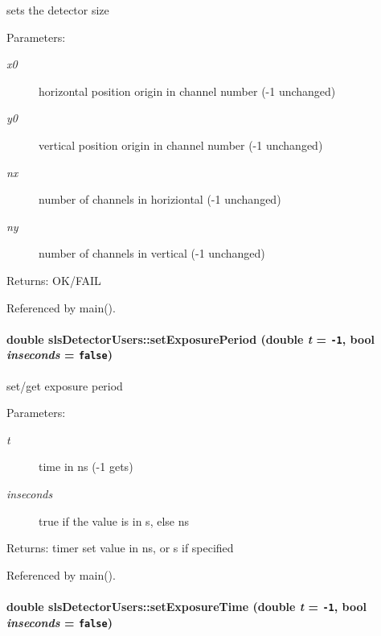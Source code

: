 sets the detector size 

\begin{Desc}
\item[Parameters:]
\begin{description}
\item[{\em x0}]horizontal position origin in channel number (-1 unchanged) \item[{\em y0}]vertical position origin in channel number (-1 unchanged) \item[{\em nx}]number of channels in horiziontal (-1 unchanged) \item[{\em ny}]number of channels in vertical (-1 unchanged) \end{description}
\end{Desc}
\begin{Desc}
\item[Returns:]OK/FAIL \end{Desc}


Referenced by main().\hypertarget{classslsDetectorUsers_cac89084aba58ebe81420c7c9ac4217a}{
\paragraph[setExposurePeriod]{\setlength{\rightskip}{0pt plus 5cm}double sls\-Detector\-Users::set\-Exposure\-Period (double {\em t} = {\tt -1}, bool {\em inseconds} = {\tt false})}\hfill}
\label{classslsDetectorUsers_cac89084aba58ebe81420c7c9ac4217a}


set/get exposure period 

\begin{Desc}
\item[Parameters:]
\begin{description}
\item[{\em t}]time in ns (-1 gets) \item[{\em inseconds}]true if the value is in s, else ns \end{description}
\end{Desc}
\begin{Desc}
\item[Returns:]timer set value in ns, or s if specified \end{Desc}


Referenced by main().\hypertarget{classslsDetectorUsers_134225893d41bc97e9f1d645e035a04a}{
\paragraph[setExposureTime]{\setlength{\rightskip}{0pt plus 5cm}double sls\-Detector\-Users::set\-Exposure\-Time (double {\em t} = {\tt -1}, bool {\em inseconds} = {\tt false})}\hfill}
\label{classslsDetectorUsers_134225893d41bc97e9f1d645e035a04a}


